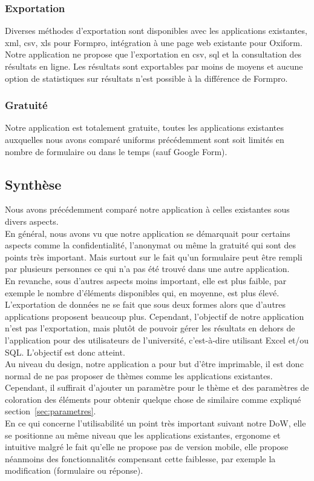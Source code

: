 \documentclass{sigplanconf}
\begin{document}
\subsubsection{Exportation}
Diverses méthodes d’exportation sont disponibles avec les applications existantes, xml, csv, xls pour Formpro, intégration à une page web existante pour Oxiform. Notre application ne propose que l’exportation en csv, sql et la consultation des résultats en ligne. Les résultats sont exportables par moins de moyens et aucune option de statistiques sur résultats n’est possible à la différence de Formpro.
\subsubsection{Gratuité}
Notre application est totalement gratuite, toutes les applications existantes auxquelles nous avons comparé uniforms précédemment sont soit limités en nombre de formulaire ou dans le temps (sauf Google Form).

\subsection{Synthèse}
Nous avons précédemment comparé notre application à celles existantes sous divers aspects.\\ En général, nous avons vu que notre application se démarquait pour certains aspects comme la confidentialité, l’anonymat ou même la gratuité qui sont des points très important. Mais surtout sur le fait qu'un formulaire peut être rempli par plusieurs personnes ce qui n'a pas été trouvé dans une autre application.\\
En revanche, sous d’autres aspects moins important, elle est plus faible, par exemple le nombre d’éléments disponibles qui, en moyenne, est plus élevé. L’exportation de données ne se fait que sous deux formes alors que d’autres applications proposent beaucoup plus. Cependant, l’objectif de notre application n’est pas l’exportation, mais plutôt de pouvoir gérer les résultats en dehors de l’application pour des utilisateurs de l'université, c'est-à-dire utilisant Excel et/ou SQL. L’objectif est donc atteint. \\
Au niveau du design, notre application a pour but d’être imprimable, il est donc normal de ne pas proposer de thèmes comme les applications existantes. Cependant, il suffirait d'ajouter un paramètre pour le thème et des paramètres de coloration des éléments pour obtenir quelque chose de similaire comme expliqué section~\ref{sec:parametres}.\\
En ce qui concerne l’utilisabilité un point très important suivant notre DoW, elle se positionne au même niveau que les applications existantes, ergonome et intuitive malgré le fait qu’elle ne propose pas de version mobile, elle propose néanmoins des fonctionnalités compensant cette faiblesse, par exemple la modification (formulaire ou réponse).
\end{document}
